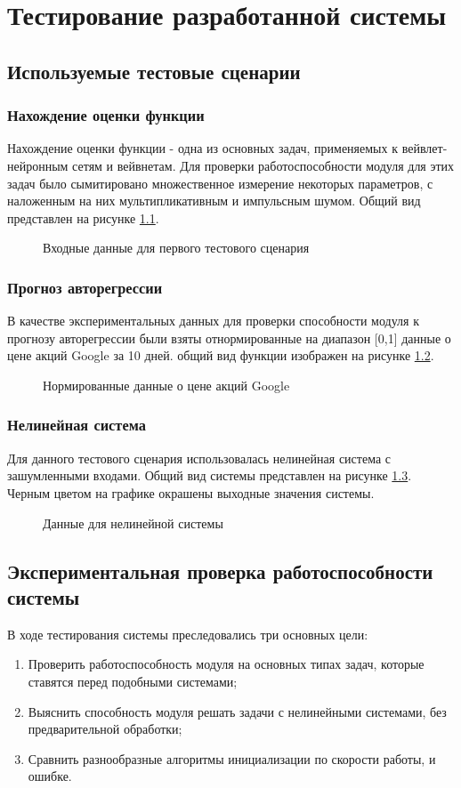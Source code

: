 \documentclass[utf8,usehyperref,14pt]{G7-32}
\begin{document}
\chapter{Тестирование разработанной системы}
\section{Используемые тестовые сценарии}
\subsection{Нахождение оценки функции}
Нахождение оценки функции - одна из основных задач, применяемых к вейвлет-нейронным сетям и вейвнетам. Для проверки работоспособности модуля для этих задач было сымитировано множественное измерение некоторых параметров, с наложенным на них мультипликативным и импульсным шумом. Общий вид представлен на рисунке \ref{sampling}.
\begin{figure}[H]
  \caption{Входные данные для первого тестового сценария}\label{sampling}
\end{figure}
\subsection{Прогноз авторегрессии}
В качестве экспериментальных данных для проверки способности модуля к прогнозу авторегрессии были взяты отнормированные на диапазон [0,1] данные о цене акций Google за 10 дней. общий вид функции изображен на рисунке \ref{google}.
\begin{figure}[H]
  \caption{Нормированные данные о цене акций Google}\label{google}
\end{figure}
\subsection{Нелинейная система}
Для данного тестового сценария использовалась нелинейная система с зашумленными входами. Общий вид системы представлен на рисунке \ref{nonlinear}. Черным цветом на графике окрашены выходные значения системы.
\begin{figure}[H]
  \caption{Данные для нелинейной системы}\label{nonlinear}
\end{figure}
\section{Экспериментальная проверка работоспособности системы}
В ходе тестирования системы преследовались три основных цели:
\begin{enumerate}
\item Проверить работоспособность модуля на основных типах задач, которые ставятся перед подобными системами;
\item Выяснить способность модуля решать задачи с нелинейными системами, без предварительной обработки;
\item Сравнить разнообразные алгоритмы инициализации по скорости работы, и ошибке.
\end{enumerate}
\end{document}
